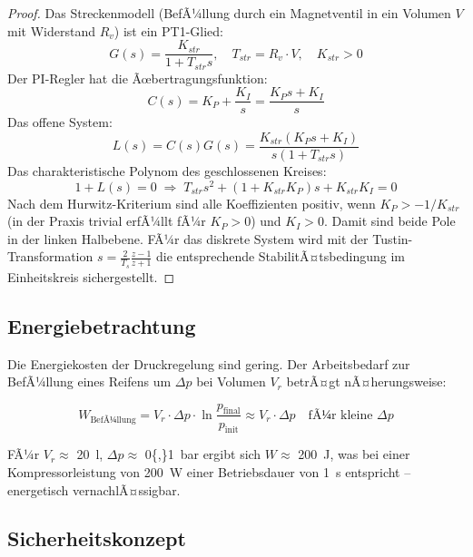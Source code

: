 ﻿\documentclass[12pt,a4paper]{article}
\theoremstyle{definition}
\theoremstyle{remark}
\begin{document}
\begin{proof}
Das Streckenmodell (BefÃ¼llung durch ein Magnetventil in ein
Volumen $V$ mit Widerstand $R_v$) ist ein PT1-Glied:
\begin{equation}
  G(s) = \frac{K_{str}}{1 + T_{str} s}, \quad
  T_{str} = R_v \cdot V, \quad K_{str} > 0
\end{equation}
Der PI-Regler hat die Ãœbertragungsfunktion:
\begin{equation}
  C(s) = K_P + \frac{K_I}{s} = \frac{K_P s + K_I}{s}
\end{equation}
Das offene System:
\begin{equation}
  L(s) = C(s) G(s) = \frac{K_{str}(K_P s + K_I)}{s(1 + T_{str} s)}
\end{equation}
Das charakteristische Polynom des geschlossenen Kreises:
\begin{equation}
  1 + L(s) = 0 \;\Rightarrow\; T_{str} s^2 + (1 + K_{str} K_P) s + K_{str} K_I = 0
\end{equation}
Nach dem Hurwitz-Kriterium sind alle Koeffizienten positiv, wenn
$K_P > -1/K_{str}$ (in der Praxis trivial erfÃ¼llt fÃ¼r $K_P > 0$) und $K_I > 0$.
Damit sind beide Pole in der linken Halbebene. FÃ¼r das diskrete System wird
mit der Tustin-Transformation $s = \frac{2}{T_s}\frac{z-1}{z+1}$ die entsprechende
StabilitÃ¤tsbedingung im Einheitskreis sichergestellt.
\end{proof}

\subsection{Energiebetrachtung}

Die Energiekosten der Druckregelung sind gering. Der Arbeitsbedarf zur
BefÃ¼llung eines Reifens um $\Delta p$ bei Volumen $V_r$ betrÃ¤gt nÃ¤herungsweise:

\begin{equation}
  W_{\text{BefÃ¼llung}} = V_r \cdot \Delta p \cdot \ln\!\frac{p_{\mathrm{final}}}{p_{\mathrm{init}}}
  \approx V_r \cdot \Delta p
  \quad\text{fÃ¼r kleine $\Delta p$}
\end{equation}

FÃ¼r $V_r \approx$ \SI{20}{\litre}, $\Delta p \approx$ \SI{0{,}1}{\bar} ergibt sich
$W \approx$ \SI{200}{\joule}, was bei einer Kompressorleistung von \SI{200}{\watt}
einer Betriebsdauer von \SI{1}{\second} entspricht -- energetisch vernachlÃ¤ssigbar.

\subsection{Sicherheitskonzept}
\end{document}
